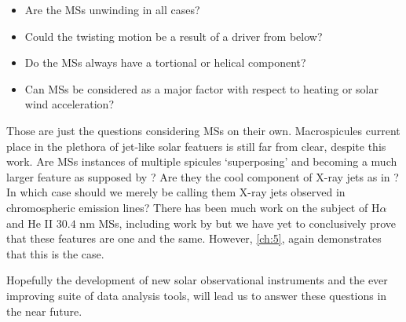 \begin{itemize}
	\item{Are the MSs unwinding in all cases?}
	\item{Could the twisting motion be a result of a driver from below?}
	\item{Do the MSs always have a tortional or helical component?}
	\item{Can MSs be considered as a major factor with respect to heating or solar wind acceleration?}
\end{itemize}
 
 
Those are just the questions considering MSs on their own.
Macrospicules current place in the plethora of jet-like solar featuers is still far from clear, despite this work.
Are MSs instances of multiple spicules `superposing' and becoming a much larger feature as supposed by \cite{Xia2005}?
Are they the cool component of X-ray jets as in \cite{Parenti2002}? In which case should we merely be calling them X-ray jets observed in chromospheric emission lines?
There has been much work on the subject of H$\alpha$ and He II $30.4$ nm MSs, including work by \cite{LaBonte79,Wang1998} but we have yet to conclusively prove that these features are one and the same.
However, \cref{ch:5}, again demonstrates that this is the case.
 
Hopefully the development of new solar observational instruments and the ever improving suite of data analysis tools, will lead us to answer these questions in the near future. 
 


